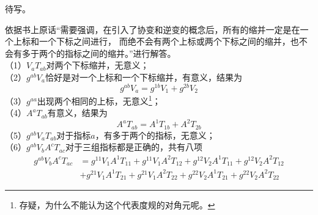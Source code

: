 \begin{solution}
	待写。
\end{solution}

	
\begin{solution}
	依据书上原话“需要强调，在引入了协变和逆变的概念后，所有的缩并一定是在一个上标和一个下标之间进行，
	而绝不会有两个上标或两个下标之间的缩并，也不会有多于两个的指标之间的缩并。”进行解答。\\
	（1）$V_a T_{ab}$对两个下标缩并，无意义；\\
	（2）$g^{ab}V_a$恰好是对一个上标和一个下标缩并，有意义，结果为
	\[g^{ab}V_a=g^{1b}V_1+g^{2b}V_2\]
	（3）$g^{aa}$出现两个相同的上标，无意义\footnote{存疑，为什么不能认为这个代表度规的对角元呢。}；\\
	（4）$A^a T_{ab}$有意义，结果为
	\[A^a T_{ab}=A^1 T_{1b}+A^2 T_{2b}\]
	（5）$g^{ab}V_a T_{ab}$对于指标$a$，有多于两个的指标，无意义；\\
	（6）$g^{ab} V_b A^c T_{ac}$对于三组指标都是正确的，共有八项
	\begin{align*}
		g^{ab} V_b A^c T_{ac}&=g^{11} V_1 A^1 T_{11}+g^{11} V_1 A^2 T_{12}+g^{12} V_2 A^1 T_{11}+g^{12} V_2 A^2 T_{12}\\
		&+g^{21} V_1 A^1 T_{21}+g^{21} V_1 A^2 T_{22}+g^{22} V_2 A^1 T_{21}+g^{22} V_2 A^2 T_{22}
	\end{align*}
\end{solution}

	
